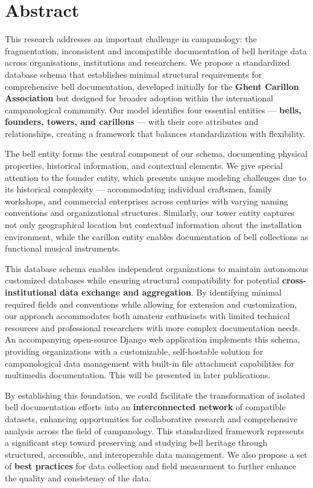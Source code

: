 \documentclass[11pt, a4paper]{article}
\begin{document}
\section{Abstract}

This research addresses an important challenge in campanology: the fragmentation, inconsistent and incompatible documentation of bell heritage data across organisations, institutions and researchers. We propose a standardized database schema that establishes minimal structural requirements for comprehensive bell documentation, developed initially for the \textbf{Ghent Carillon Association} but designed for broader adoption within the international campanological community. Our model identifies four essential entities — \textbf{bells, founders, towers, and carillons} — with their core attributes and relationships, creating a framework that balances standardization with flexibility.

The bell entity forms the central component of our schema, documenting physical properties, historical information, and contextual elements. We give special attention to the founder entity, which presents unique modeling challenges due to its historical complexity — accommodating individual craftsmen, family workshops, and commercial enterprises across centuries with varying naming conventions and organizational structures. Similarly, our tower entity captures not only geographical location but contextual information about the installation environment, while the carillon entity enables documentation of bell collections as functional musical instruments.

This database schema enables independent organizations to maintain autonomous customized databases while ensuring structural compatibility for potential \textbf{cross-institutional data exchange and aggregation}. By identifying minimal required fields and conventions while allowing for extension and customization, our approach accommodates both amateur enthusiasts with limited technical resources and professional researchers with more complex documentation needs. An accompanying open-source Django web application implements this schema, providing organizations with a customizable, self-hostable solution for campanological data management with built-in file attachment capabilities for multimedia documentation. This will be presented in later publications.

By establishing this foundation, we could facilitate the transformation of isolated bell documentation efforts into an \textbf{interconnected network} of compatible datasets, enhancing opportunities for collaborative research and comprehensive analysis across the field of campanology. This standardized framework represents a significant step toward preserving and studying bell heritage through structured, accessible, and interoperable data management. We also propose a set of \textbf{best practices} for data collection and field measurment to further enhance the quality and consistensy of the data.
\end{document}
